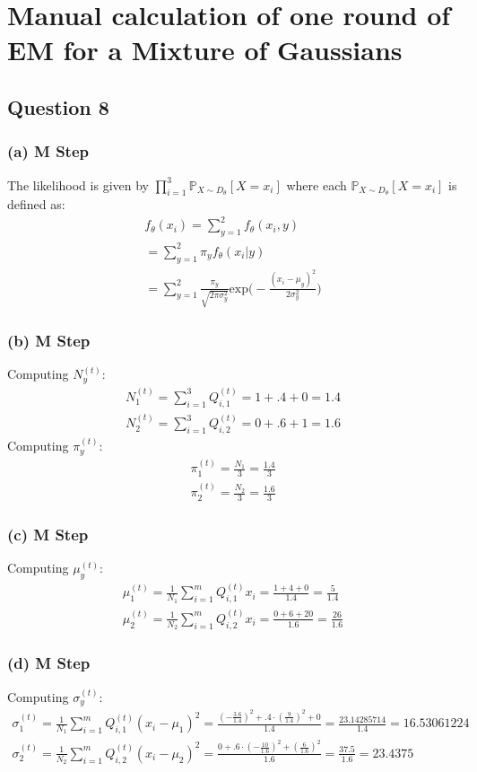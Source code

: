 \documentclass[11pt, oneside]{article}   	%
\begin{document}
\section{Manual calculation of one round of EM for a Mixture of Gaussians}
\subsection{Question 8}
\subsubsection{(a) M Step}
The likelihood is given by $\prod_{i = 1}^{3} \mathbb{P}_{X \sim D_\theta}[X = x_i]$ where each $\mathbb{P}_{X \sim D_\theta}[X = x_i]$ is defined as:
\begin{gather*}
 f_{\theta}(x_i) = \sum_{y = 1}^2 f_\theta(x_i, y)\\
= \sum_{y = 1}^2 \pi_y f_\theta(x_i | y)\\
= \sum_{y = 1}^2 \frac{\pi_y}{\sqrt{2\pi \sigma_{y}^2}} \text{exp}\bigg(-\frac{(x_i - \mu_y)^2}{2 \sigma_{y}^2}\bigg)
\end{gather*}
\subsubsection{(b) M Step}
Computing $N_{y}^{(t)}$:
\begin{gather*}
N_{1}^{(t)} = \sum_{i = 1}^3 Q_{i, 1}^{(t)} = 1 + .4 + 0 = 1.4\\
N_{2}^{(t)} = \sum_{i = 1}^3 Q_{i, 2}^{(t)} = 0 + .6 + 1 = 1.6
\end{gather*}
Computing $\pi_{y}^{(t)}$:
\begin{gather*}
\pi_{1}^{(t)} = \frac{N_1}{3} = \frac{1.4}{3}\\
\pi_{2}^{(t)} = \frac{N_2}{3} = \frac{1.6}{3}
\end{gather*}
\subsubsection{(c) M Step}
Computing $\mu_{y}^{(t)}$:
\begin{gather*}
\mu_{1}^{(t)} = \frac{1}{N_1} \sum_{i = 1}^{m} Q_{i, 1}^{(t)} x_i = \frac{1 + 4 + 0}{1.4} = \frac{5}{1.4}\\
\mu_{2}^{(t)} = \frac{1}{N_2} \sum_{i = 1}^{m} Q_{i, 2}^{(t)} x_i = \frac{0 + 6 + 20}{1.6} = \frac{26}{1.6}
\end{gather*}
\subsubsection{(d) M Step}
Computing $\sigma_{y}^{(t)}$:
\begin{gather*}
\sigma_{1}^{(t)} = \frac{1}{N_1} \sum_{i = 1}^{m} Q_{i, 1}^{(t)} (x_i - \mu_{1})^2 = \frac{(-\frac{3.6}{1.4})^2 + .4 \cdot (\frac{9}{1.4})^2 + 0}{1.4} = \frac{23.14285714}{1.4} = 16.53061224\\
\sigma_{2}^{(t)} = \frac{1}{N_2} \sum_{i = 1}^{m} Q_{i, 2}^{(t)} (x_i - \mu_{2})^2 = \frac{0 + .6 \cdot (-\frac{10}{1.6})^2 + (\frac{6}{1.6})^2}{1.6} = \frac{37.5}{1.6} = 23.4375
\end{gather*}
\end{document}
